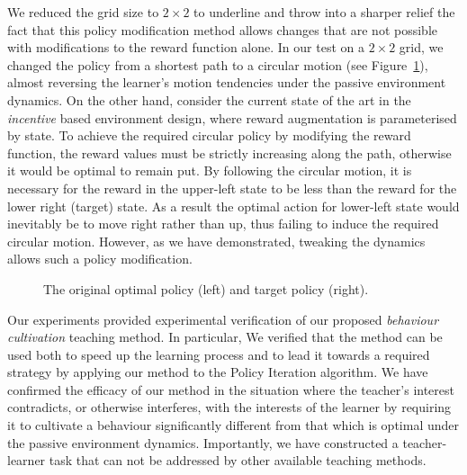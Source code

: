 We reduced the grid size to $2\times 2$ to underline and throw
into a sharper relief the fact that this policy modification method
allows changes that are not possible with modifications to the reward
function alone. In our test on a $2 \times 2$ grid, we changed the
policy from a shortest path to a circular motion (see
Figure~\ref{envdopt}), almost reversing the learner's motion
tendencies under the passive environment dynamics. On the other hand,
consider the current state of the art in the {\em incentive} based
environment design, where reward augmentation is parameterised by
state. To achieve the required circular policy by modifying the reward
function, the reward values must be strictly increasing along the
path, otherwise it would be optimal to remain put. By following the
circular motion, it is necessary for the reward in the upper-left
state to be less than the reward for the lower right (target)
state. As a result the optimal action for lower-left state would
inevitably be to move right rather than up, thus failing to induce the
required circular motion. However, as we have demonstrated, tweaking
the dynamics allows such a policy modification.

\begin{figure}[ht]
\centerline{}
\caption{\label{envdopt}The original optimal policy (left) and target policy (right).}
\end{figure}

Our experiments provided experimental verification of our proposed
{\em behaviour cultivation} teaching method. In particular, We verified that the
method can be used both to speed up the learning process and to lead
it towards a required strategy by applying our method to the Policy
Iteration algorithm. We have confirmed the efficacy of our method in
the situation where the teacher's interest contradicts, or otherwise
interferes, with the interests of the learner by requiring it to
cultivate a behaviour significantly different from that which is
optimal under the passive environment dynamics. Importantly, we have
constructed a teacher-learner task that can not be addressed by other
available teaching methods.
